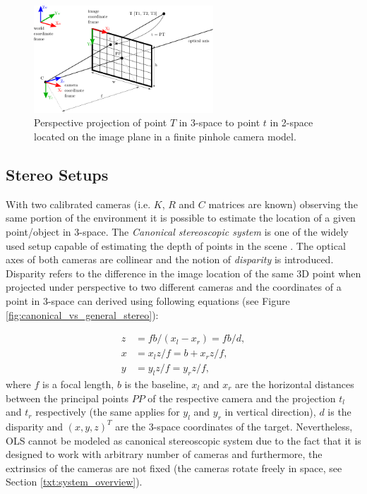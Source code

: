\begin{figure}[tbh]
	\centering
	\includegraphics[width=0.60\textwidth]{fig/pinhole_camera.pdf}
	\caption{Perspective projection of point $T$ in 3-space to point $t$ in 2-space located on the image plane in a finite pinhole camera model.}
	\label{fig:pinhole_camera}
\end{figure}

\subsection{Stereo Setups}

With two calibrated cameras (i.e. $K$, $R$ and $C$ matrices are known) observing the same portion of the environment it is possible to estimate the location of a given point/object in 3-space. The \textit{Canonical stereoscopic system} is one of the widely used setup capable of estimating the depth of points in the scene \cite{Cyganek:2007:ICV:1214366}. The optical axes of both cameras are collinear and the notion of \textit{disparity} is introduced. Disparity refers to the difference in the image location of the same 3D point when projected under perspective to two different cameras \cite{Stockman:2001:CV:558008} and the coordinates of a point in 3-space can derived using following equations (see Figure \ref{fig:canonical_vs_general_stereo}):

\begin{align}
	z &= fb/(x_{l} - x_{r}) = fb/d,\\
	x &= x_{l}z/f = b + x_{r}z/f,\\
	y &= y_{l}z/f = y_{r}z/f,
\end{align}
where $f$ is a focal length, $b$ is the baseline, $x_{l}$ and $x_{r}$ are the horizontal distances between the principal points $PP$ of the respective camera and the projection $t_{l}$ and $t_{r}$ respectively (the same applies for $y_{l}$ and $y_{r}$ in vertical direction), $d$ is the disparity and $(x, y, z)^{T}$ are the 3-space coordinates of the target. Nevertheless, OLS cannot be modeled as canonical stereoscopic system due to the fact that it is designed to work with arbitrary number of cameras and furthermore, the extrinsics of the cameras are not fixed (the cameras rotate freely in space, see Section \ref{txt:system_overview}).

